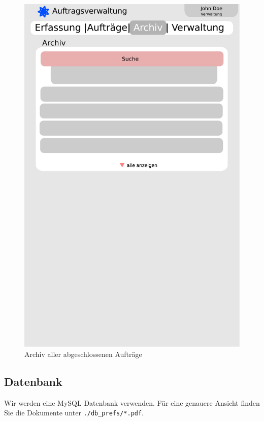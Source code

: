 \documentclass[ngerman, 12pt, pdftex]{scrartcl}[2006/07/30]
\begin{document}
\begin{figure}[p]
\begin{minipage}{0.4\textwidth}
   		\includegraphics[scale=0.3]{./design/archive_order.pdf}
		\caption{Archiv aller abgeschlossenen Aufträge}
	\end{minipage} 
	
\end{figure}

\subsection{Datenbank}
Wir werden eine MySQL Datenbank verwenden. Für eine genauere Ansicht finden Sie die Dokumente unter 
 \verb+./db_prefs/*.pdf+.
\end{document}
